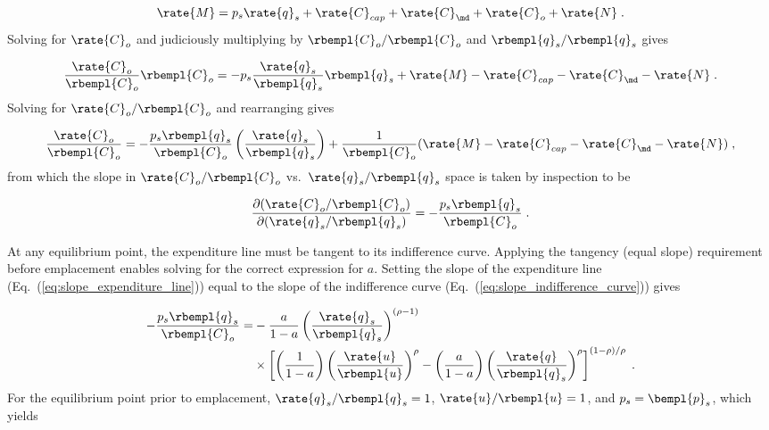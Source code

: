 \begin{equation}
  \rate{M} = p_s \rate{q}_s + \rate{C}_{cap} + \rate{C}_{\md} + \rate{C}_o  + \rate{N} \; . 
\end{equation}
%
Solving for $\rate{C}_o$ and judiciously multiplying by $\rbempl{C}_o/\rbempl{C}_o$
and $\rbempl{q}_s/\rbempl{q}_s$ gives

\begin{equation}
  \frac{\rate{C}_o}{\rbempl{C}_o} \rbempl{C}_o = - p_s \frac{\rate{q}_s}{\rbempl{q}_s} \rbempl{q}_s
                        + \rate{M} - \rate{C}_{cap} - \rate{C}_{\md}  - \rate{N} \; .
\end{equation}
%
Solving for $\rate{C}_o/\rbempl{C}_o$ and rearranging gives

\begin{equation}
  \frac{\rate{C}_o}{\rbempl{C}_o} = - \frac{p_s \rbempl{q}_s}{\rbempl{C}_o}  
                                        \left( \frac{\rate{q}_s}{\rbempl{q}_s}   \right)
                                    + \frac{1}{\rbempl{C}_o}
                                          (\rate{M} - \rate{C}_{cap} - \rate{C}_{\md} - \rate{N}) \; ,
\end{equation}
%
from which the slope in $\rate{C}_o/\rbempl{C}_o$ vs.\ $\rate{q}_s/\rbempl{q}_s$ space
is taken by inspection to be

\begin{equation} \label{eq:slope_expenditure_line}
  \frac{\partial (\rate{C}_o/\rbempl{C}_o)}{\partial (\rate{q}_s/\rbempl{q}_s)} =
              - \frac{p_s \rbempl{q}_s}{\rbempl{C}_o} \; .
\end{equation}

At any equilibrium point, the expenditure line must be tangent to its indifference curve.
Applying the tangency (equal slope) requirement before emplacement enables 
solving for the correct expression for $a$.
Setting the slope of the expenditure line (Eq.~(\ref{eq:slope_expenditure_line}))
equal to the slope of the indifference curve (Eq.~(\ref{eq:slope_indifference_curve})) gives

\begin{align}
  - \frac{p_s \rbempl{q}_s}{\rbempl{C}_o} =& 
        -\frac{a}{1 - a} \left( \frac{\rate{q}_s}{\rbempl{q}_s} \right)^{(\rho -1)} \nonumber \\
        &\times \left[ \left( \frac{1}{1 - a} \right) \left( \frac{\rate{u}}{\rbempl{u}} \right)^\rho
                - \left( \frac{a}{1 - a} \right) 
                          \left( \frac{\rate{q}}{\rbempl{q}_s} \right)^\rho \right]^{(1 - \rho)/\rho} \; .
\end{align}
%
For the equilibrium point 
prior to emplacement, $\rate{q}_s/\rbempl{q}_s = 1$, $\rate{u}/\rbempl{u} = 1$, and
$p_s = \bempl{p}_s$, which yields

